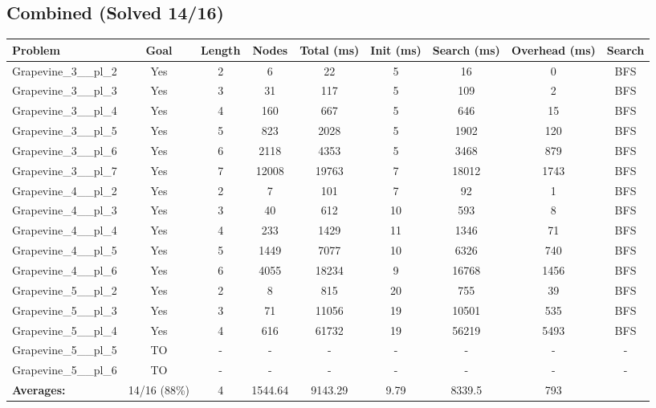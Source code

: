 \documentclass{article}
\begin{document}
\subsection*{Combined (Solved 14/16)}
\begin{tabular}{lcccccccc}
\toprule
Problem & Goal & Length & Nodes & Total (ms) & Init (ms) & Search (ms) & Overhead (ms) & Search \\
\midrule
Grapevine\_3\_\_pl\_2 & Yes & 2 & 6 & 22 & 5 & 16 & 0 & BFS \\
Grapevine\_3\_\_pl\_3 & Yes & 3 & 31 & 117 & 5 & 109 & 2 & BFS \\
Grapevine\_3\_\_pl\_4 & Yes & 4 & 160 & 667 & 5 & 646 & 15 & BFS \\
Grapevine\_3\_\_pl\_5 & Yes & 5 & 823 & 2028 & 5 & 1902 & 120 & BFS \\
Grapevine\_3\_\_pl\_6 & Yes & 6 & 2118 & 4353 & 5 & 3468 & 879 & BFS \\
Grapevine\_3\_\_pl\_7 & Yes & 7 & 12008 & 19763 & 7 & 18012 & 1743 & BFS \\
Grapevine\_4\_\_pl\_2 & Yes & 2 & 7 & 101 & 7 & 92 & 1 & BFS \\
Grapevine\_4\_\_pl\_3 & Yes & 3 & 40 & 612 & 10 & 593 & 8 & BFS \\
Grapevine\_4\_\_pl\_4 & Yes & 4 & 233 & 1429 & 11 & 1346 & 71 & BFS \\
Grapevine\_4\_\_pl\_5 & Yes & 5 & 1449 & 7077 & 10 & 6326 & 740 & BFS \\
Grapevine\_4\_\_pl\_6 & Yes & 6 & 4055 & 18234 & 9 & 16768 & 1456 & BFS \\
Grapevine\_5\_\_pl\_2 & Yes & 2 & 8 & 815 & 20 & 755 & 39 & BFS \\
Grapevine\_5\_\_pl\_3 & Yes & 3 & 71 & 11056 & 19 & 10501 & 535 & BFS \\
Grapevine\_5\_\_pl\_4 & Yes & 4 & 616 & 61732 & 19 & 56219 & 5493 & BFS \\
Grapevine\_5\_\_pl\_5 & TO & - & - & - & - & - & - & - \\
Grapevine\_5\_\_pl\_6 & TO & - & - & - & - & - & - & - \\
\textbf{Averages:} & 14/16 (88\%) & 4 & 1544.64 & 9143.29 & 9.79 & 8339.5 & 793 & \\
\bottomrule
\end{tabular}
\\[0.7cm]
\end{document}
